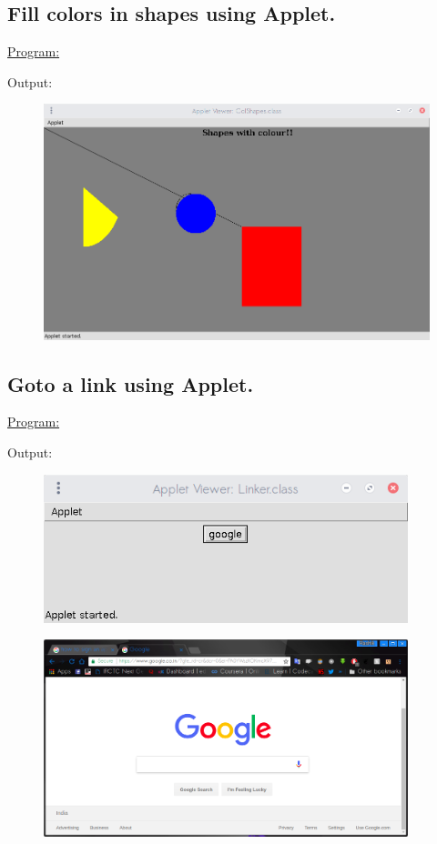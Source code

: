 \documentclass[a4paper,11pt]{article}
\begin{document}
\bigskip

\subsection{Fill colors in shapes using Applet.}
\underline{Program:}


Output:
\begin{figure}[H]
\centering
\includegraphics[width=350pt,height=\textheight,keepaspectratio]{../assign2/pics/4.png}
\end{figure}

\bigskip

\subsection{Goto a link using Applet.}
\underline{Program:}


Output:
\begin{figure}[H]
\centering
\includegraphics[width=300pt,height=\textheight,keepaspectratio]{../assign2/pics/5.png}
\end{figure}
\bigskip
\begin{figure}[H]
\centering
\includegraphics[width=300pt,height=\textheight,keepaspectratio]{../assign2/pics/5-1.png}
\end{figure}
\end{document}
